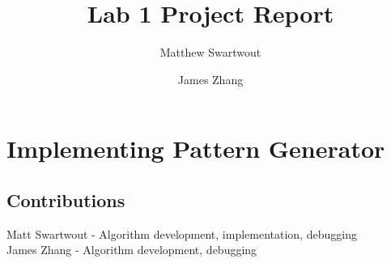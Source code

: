 \documentclass{article}
\begin{document}
\title{Lab 1 Project Report}
\author{Matthew Swartwout \and James Zhang}
\maketitle

\section{Implementing Pattern Generator}
\subsection{Contributions}
Matt Swartwout - Algorithm development, implementation, debugging \\
James Zhang - Algorithm development, debugging
\end{document}
